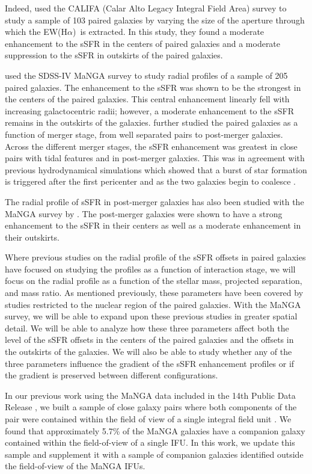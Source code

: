 \documentclass[iop,revtex4,twocolumn,apj,numberedappendix,appendixfloats]{emulateapj}
\newcommand{\ewha}{EW(H$\alpha$)}
\begin{document}
Indeed, \citet{Barrera-Ballesteros:2015} used the CALIFA (Calar Alto Legacy Integral Field Area) survey to study a sample of 103 paired galaxies by varying the size of the aperture through which the \ewha\ is extracted. In this study, they found a moderate enhancement to the sSFR in the centers of paired galaxies and a moderate suppression to the sSFR in outskirts of the paired galaxies. 

\citet{Pan:2019} used the SDSS-IV MaNGA survey to study radial profiles of a sample of 205 paired galaxies. The enhancement to the sSFR was shown to be the strongest in the centers of the paired galaxies. This central enhancement linearly fell with increasing galactocentric radii; however, a moderate enhancement to the sSFR remains in the outskirts of the galaxies. \citet{Pan:2019} further studied the paired galaxies as a function of merger stage, from well separated pairs to post-merger galaxies. Across the different merger stages, the sSFR enhancement was greatest in close pairs with tidal features and in post-merger galaxies. This was in agreement with previous hydrodynamical simulations which showed that a burst of star formation is triggered after the first pericenter and as the two galaxies begin to coalesce \citep{Scudder:2012}. 

The radial profile of sSFR in post-merger galaxies has also been studied with the MaNGA survey by \citet{Thorp:2019}. The post-merger galaxies were shown to have a strong enhancement to the sSFR in their centers as well as a moderate enhancement in their outskirts. 

Where previous studies on the radial profile of the sSFR offsets in paired galaxies have focused on studying the profiles as a function of interaction stage, we will focus on the radial profile as a function of the stellar mass, projected separation, and mass ratio. As mentioned previously, these parameters have been covered by studies restricted to the nuclear region of the paired galaxies. With the MaNGA survey, we will be able to expand upon these previous studies in greater spatial detail. We will be able to analyze how these three parameters affect both the level of the sSFR offsets in the centers of the paired galaxies and the offsets in the outskirts of the galaxies. We will also be able to study whether any of the three parameters influence the gradient of the sSFR enhancement profiles or if the gradient is preserved between different configurations. 

In our previous work using the MaNGA data included in the 14th Public Data Release \citep[DR14;][]{Abolfathi:2018}, we built a sample of close galaxy pairs where both components of the pair were contained within the field of view of a single integral field unit \citep[][hereafter ]{Fu:2018}. We found that approximately 5.7\% of the MaNGA galaxies have a companion galaxy contained within the field-of-view of a single IFU. In this work, we update this sample and supplement it with a sample of companion galaxies identified outside the field-of-view of the MaNGA IFUs. 
\end{document}
